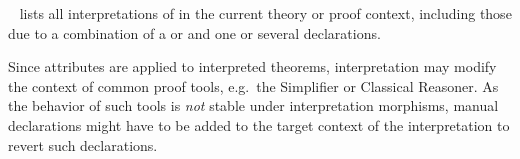 \begin{isabellebody}
\begin{isamarkuptext}
\begin{description}
  \item \hyperlink{command.print-interps}{\mbox{}}~ lists all
  interpretations of  in the current theory or proof
  context, including those due to a combination of a \hyperlink{command.interpretation}{\mbox{}} or \hyperlink{command.interpret}{\mbox{}} and one or several
  \hyperlink{command.sublocale}{\mbox{}} declarations.

  \end{description}

  \begin{warn}
    Since attributes are applied to interpreted theorems,
    interpretation may modify the context of common proof tools, e.g.\
    the Simplifier or Classical Reasoner.  As the behavior of such
    tools is \emph{not} stable under interpretation morphisms, manual
    declarations might have to be added to the target context of the
    interpretation to revert such declarations.
  \end{warn}


\end{isamarkuptext}
\end{isabellebody}

